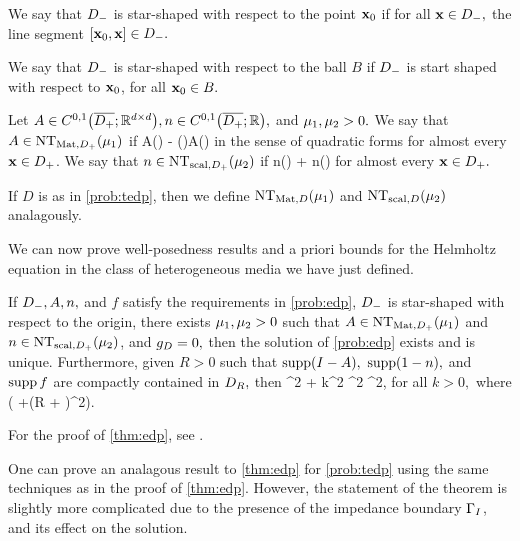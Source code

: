 
  We say that $D_{-}$ is star-shaped with respect to the point $\mathbf{x}_{0}$ if for all $\mathbf{x} \in D_{-},$ the line segment $\mleft[\bxz,\bx\mright] \in \Dm.$

  We say that $D_{-}$ is star-shaped with respect to the ball $B$ if $D_{-}$ is start shaped with respect to $\mathbf{x}_{0}$, for all $\mathbf{x}_{0} \in B.$
  \ede
  
\label{def:NT}
Let $A \in \CzoDpclosRRdtd, n \in \CzoDpclosRR,$ and $\mu_{1}, \mu_{2} > 0.$ We say that $A \in \NTADp{\muo}$ if
\beqs
A(\bx) - \mleft(\bx \cdot \grad\mright)A(\bx) \geq \muo
\eeqs
in the sense of quadratic forms for almost every $\mathbf{x} \in D_{+}$. We say that $n \in \NTnDp{\mut}$ if
\beqs
n(\bx) + \bx \cdot \grad n(\bx) \geq \mut
\eeqs
for almost every $\mathbf{x} \in D_{+}.$

If $D$ is as in \cref{prob:tedp}, then we define $\NTAD{\muo}$ and $\NTnD{\mut}$ analagously.
\ede
{}

We can now prove well-posedness results and a priori bounds for the Helmholtz equation in the class of heterogeneous media we have just defined.

\label{thm:edp}
If $D_{-}, A, n,$ and $f$ satisfy the requirements in \cref{prob:edp}, $D_{-}$ is star-shaped with respect to the origin, there exists $\mu_{1}, \mu_{2} > 0$ such that $A \in \NTADp{\muo}$ and $n \in \NTnDp{\mut}$, and $g_{D} = 0,$ then the solution of \cref{prob:edp} exists and is unique. Furthermore, given $R>0$ such that $\supp\mleft(I-A\mright),$ $\operatorname{supp}(1-n),$ and $\operatorname{supp} f$ are compactly contained in $D_{R},$ then
\beqs
\muo {}^2 + \mut k^2 ^2 \leq \Co {}^2,
\eeqs
for all $k>0,$ where
\beqs
\Co {}\mleft( +\mleft(R + \mright)^2\mright).
\eeqs
\enth

For the proof of \cref{thm:edp}, see \cite[Theorem 2.5]{GrPeSp:19}.

One can prove an analagous result to \cref{thm:edp} for \cref{prob:tedp} using the same techniques as in the proof of \cref{thm:edp}. However, the statement of the theorem is slightly more complicated due to the presence of the impedance boundary $\Gamma_{I}$, and its effect on the solution.

